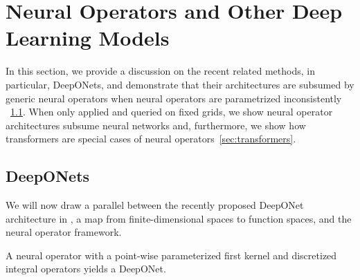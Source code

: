 \section{Neural Operators and Other Deep Learning Models}
\label{sec:framework}

In this section, we provide a discussion on the recent related methods, in particular, DeepONets, and demonstrate that their architectures are subsumed by generic neural operators when neural operators are parametrized inconsistently ~\ref{sec:deeponets}. When only applied and queried on fixed grids, we show neural operator architectures subsume neural networks and, furthermore, we show how transformers are special cases of neural operators~\ref{sec:transformers}.


\subsection{DeepONets}
\label{sec:deeponets}

We will now draw a parallel between the recently proposed DeepONet architecture in \citet{lu2019deeponet}, a map from finite-dimensional spaces to function spaces, and the neural operator framework. 

\begin{proposition}
\label{prop:deeponet}
A neural operator with a point-wise parameterized first kernel and discretized integral operators yields a DeepONet.
\end{proposition}




